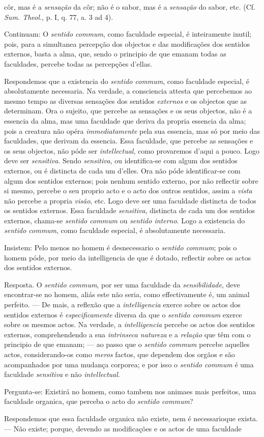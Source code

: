 côr, mas é a \emph{sensação} da côr; não é o sabor, mas é a \emph{sensação} do sabor, etc. (Cf. \emph{Sum. Theol.}, p. I, q. 77, a. 3 ad 4).\par Continuam: O \emph{sentido commum}, como faculdade especial, é inteiramente inutil; pois, para a simultanea percepção dos objectos e das modificações dos sentidos externos, basta a alma, que, sendo o principio de que emanam todas as faculdades, percebe todas as percepções d'ellas.\par Respondemos que a existencia do \emph{sentido commum}, como faculdade especial, é absolutamente necessaria. Na verdade, a consciencia attesta que percebemos ao mesmo tempo as diversas sensações dos sentidos \emph{externos} e os objectos que as determinam. Ora o sujeito, que percebe as sensações e os seus objectos, não é a essencia da alma, mas uma faculdade que deriva da propria essencia da alma; pois a creatura não opéra \emph{immediatamente} pela sua essencia, mas só por meio das faculdades, que derivam da essencia. Essa faculdade, que percebe as sensações e os seus objectos, não póde ser \emph{intellectual}, como provaremos d'aqui a pouco. Logo deve ser \emph{sensitiva}. Sendo \emph{sensitiva}, ou identifica-se com algum dos sentidos externos, ou é distincta de cada um d'elles. Ora não póde identificar-se com algum dos sentidos externos; pois nenhum sentido externo, por não reflectir sobre si mesmo, percebe o seu proprio acto e o acto dos outros sentidos, assim a \emph{vista} não percebe a propria \emph{visão}, etc. Logo deve ser uma faculdade distincta de todos os sentidos externos. Essa faculdade \emph{sensitiva}, distincta de cada um dos sentidos externos, chama-se \emph{sentido commum} ou \emph{sentido interno}. Logo a existencia do \emph{sentido commum}, como faculdade especial, é absolutamente necessaria.\par Insistem: Pelo menos no homem é desnecessario o \emph{sentido commum}; pois o homem póde, por meio da intelligencia de que é dotado, reflectir sobre os actos dos sentidos externos.\par Resposta. O \emph{sentido commum}, por ser uma faculdade da \emph{sensibilidade}, deve encontrar-se no homem, aliás este não seria, como effectivamente é, um animal perfeito. --- De mais, a reflexão que a \emph{intelligencia} exerce sobre os actos dos sentidos externos é \emph{especificamente} diversa da que o \emph{sentido commum} exerce sobre os mesmos actos. Na verdade, a \emph{intelligencia} percebe os actos dos sentidos externos, comprehendendo a sua \emph{intrinseca natureza} e a \emph{relação} que têm com o principio de que emanam; --- ao passo que o \emph{sentido commum} percebe aquelles actos, considerando-os como \emph{meros} factos, que dependem dos orgãos e são acompanhados por uma mudança corporea; e por isso o \emph{sentido commum} é uma faculdade \emph{sensitiva} e não \emph{intellectual}.\par Pergunta-se: Existirá no homem, como tambem nos animaes mais perfeitos, uma faculdade organica, que perceba o acto do \emph{sentido commum}?\par Respondemos que essa faculdade organica não existe, nem é necessarioque exista. --- Não existe; porque, devendo as modificações e os actos de uma faculdade 